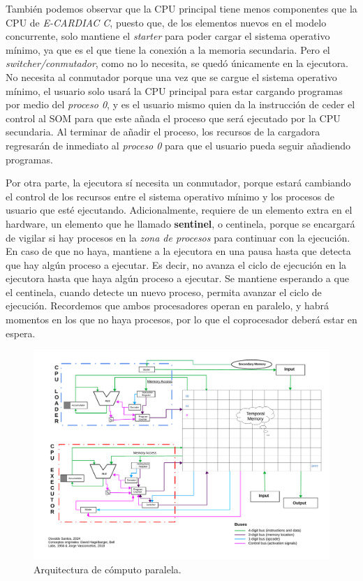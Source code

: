 \documentclass[letterpaper,12pt,oneside]{book}
\begin{document}
		
		También podemos observar que la CPU principal tiene menos componentes que la CPU de \textit{E-CARDIAC C}, 
		puesto que, de los elementos nuevos en el modelo concurrente, solo mantiene el \textit{starter} para
		poder cargar el sistema operativo mínimo, ya que es el que tiene la conexión a la memoria secundaria.
		 Pero el \textit{switcher/conmutador}, como no lo 
		necesita, se quedó
		únicamente en la ejecutora. No necesita al conmutador porque una vez que se cargue el sistema operativo mínimo, el usuario solo usará
		la CPU principal para estar cargando programas por medio del \textit{proceso 0}, 
		y es el usuario mismo quien da la instrucción de ceder el control
		al SOM para que este añada el proceso que será ejecutado por la CPU secundaria. Al terminar de añadir el proceso, los recursos de la cargadora 
		regresarán de inmediato al \textit{proceso 0} para que el usuario
		pueda seguir añadiendo programas.
		
		Por otra parte, la ejecutora sí necesita un conmutador, porque estará cambiando el control de los recursos entre el sistema operativo mínimo
		y los procesos de usuario que esté ejecutando. Adicionalmente, requiere de un elemento extra en el hardware, un elemento que he llamado 
		\textbf{sentinel}, o centinela, porque se encargará
		de vigilar si hay procesos en la \textit{zona de procesos} para continuar con la ejecución. En caso de que no haya, mantiene a la ejecutora
		en una pausa hasta que detecta que hay algún proceso a ejecutar. Es decir, no avanza el ciclo de ejecución en la ejecutora hasta que haya
		algún proceso a ejecutar. Se mantiene esperando a que el centinela, cuando detecte un nuevo proceso, permita avanzar el ciclo de ejecución.
		Recordemos que ambos procesadores operan en paralelo,
		y habrá momentos en los que no haya procesos, por lo que el coprocesador deberá estar en espera.

        \begin{figure}[H]		
			\centering
			\includegraphics[scale=0.64, angle=90]{media/Paralela/Arquitectura_diagrama_Paralelo.pdf}
			\caption{ Arquitectura de cómputo paralela.}
			\label{fig:diag_arq_parallel}
		\end{figure}
  
\end{document}
